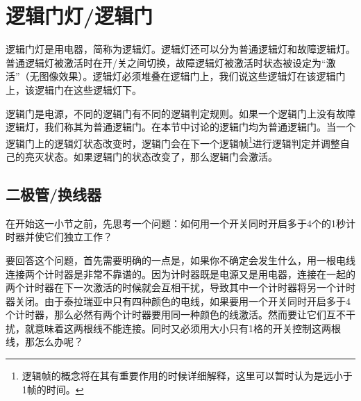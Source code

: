 \begin{figure}[!h]
\begin{center}
\qquad\qquad
{}
\end{center}
\caption{}
\label{i32:33}
\end{figure}

\section{逻辑门灯/逻辑门}

逻辑门灯是用电器，简称为逻辑灯。逻辑灯还可以分为普通逻辑灯和故障逻辑灯。普通逻辑灯被激活时在开/关之间切换，故障逻辑灯被激活时状态被设定为“激活”（无图像效果）。逻辑灯必须堆叠在逻辑门上，我们说这些逻辑灯在该逻辑门上，该逻辑门在这些逻辑灯下。

逻辑门是电源，不同的逻辑门有不同的逻辑判定规则。如果一个逻辑门上没有故障逻辑灯，我们称其为普通逻辑门。在本节中讨论的逻辑门均为普通逻辑门。当一个逻辑门上的逻辑灯状态改变时，逻辑门会在下一个逻辑帧\footnote{逻辑帧的概念将在其有重要作用的时候详细解释，这里可以暂时认为是远小于1帧的时间。}进行逻辑判定并调整自己的亮灭状态。如果逻辑门的状态改变了，那么逻辑门会激活。

\subsection{二极管/换线器}

在开始这一小节之前，先思考一个问题：如何用一个开关同时开启多于4个的1秒计时器并使它们独立工作？

要回答这个问题，首先需要明确的一点是，如果你不确定会发生什么，用一根电线连接两个计时器是非常不靠谱的。因为计时器既是电源又是用电器，连接在一起的两个计时器在下一次激活的时候就会互相干扰，导致其中一个计时器将另一个计时器关闭。由于泰拉瑞亚中只有四种颜色的电线，如果要用一个开关同时开启多于4个计时器，那么必然有两个计时器要用同一种颜色的线激活。然而要让它们互不干扰，就意味着这两根线不能连接。同时又必须用大小只有1格的开关控制这两根线，那怎么办呢？

